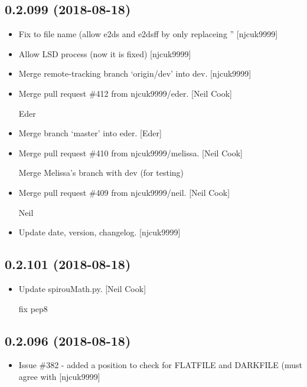 \documentclass[a4paper,10pt,english]{report}
\begin{document}
\subsection{0.2.099 (2018-08-18)}
\label{\detokenize{misc/changelog:id362}}\begin{itemize}
\item {} 
Fix to file name (allow e2ds and e2dsff by only replaceing ”
{[}njcuk9999{]}

\item {} 
Allow LSD process (now it is fixed) {[}njcuk9999{]}

\item {} 
Merge remote-tracking branch ‘origin/dev’ into dev. {[}njcuk9999{]}

\item {} 
Merge pull request \#412 from njcuk9999/eder. {[}Neil Cook{]}

Eder

\item {} 
Merge branch ‘master’ into eder. {[}Eder{]}

\item {} 
Merge pull request \#410 from njcuk9999/melissa. {[}Neil Cook{]}

Merge Melissa’s branch with dev (for testing)

\item {} 
Merge pull request \#409 from njcuk9999/neil. {[}Neil Cook{]}

Neil

\item {} 
Update date, version, changelog. {[}njcuk9999{]}

\end{itemize}


\subsection{0.2.101 (2018-08-18)}
\label{\detokenize{misc/changelog:id363}}\begin{itemize}
\item {} 
Update spirouMath.py. {[}Neil Cook{]}

fix pep8

\end{itemize}


\subsection{0.2.096 (2018-08-18)}
\label{\detokenize{misc/changelog:id364}}\begin{itemize}
\item {} 
Issue \#382 - added a position to check for FLATFILE and DARKFILE (must
agree with  {[}njcuk9999{]}

\end{itemize}
\end{document}
